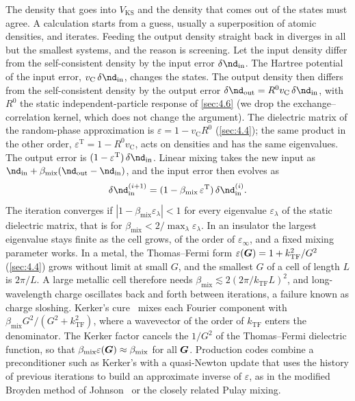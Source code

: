 The density that goes into $V_{\mathrm{KS}}$ and the density that comes out of the states must agree. A calculation starts from a guess, usually a superposition of atomic densities, and iterates. Feeding the output density straight back in diverges in all but the smallest systems, and the reason is screening. Let the input density differ from the self-consistent density by the input error $\delta\nd_{\mathrm{in}}$. The Hartree potential of the input error, $v_{\mathrm{C}}\,\delta\nd_{\mathrm{in}}$, changes the states. The output density then differs from the self-consistent density by the output error $\delta\nd_{\mathrm{out}} = R^0v_{\mathrm{C}}\,\delta\nd_{\mathrm{in}}$, with $R^0$ the static independent-particle response of \cref{sec:4.6} (we drop the exchange--correlation kernel, which does not change the argument). The dielectric matrix of the random-phase approximation is $\varepsilon = 1 - v_{\mathrm{C}}R^0$ (\cref{sec:4.4}); the same product in the other order, $\varepsilon^{\mathrm{T}} = 1 - R^0v_{\mathrm{C}}$, acts on densities and has the same eigenvalues. The output error is $(1 - \varepsilon^{\mathrm{T}})\,\delta\nd_{\mathrm{in}}$. Linear mixing takes the new input as $\nd_{\mathrm{in}} + \beta_{\mathrm{mix}}(\nd_{\mathrm{out}} - \nd_{\mathrm{in}})$, and the input error then evolves as
\begin{equation}
  \delta\nd_{\mathrm{in}}^{(i+1)} = (1 - \beta_{\mathrm{mix}}\,\varepsilon^{\mathrm{T}})\,\delta\nd_{\mathrm{in}}^{(i)} .
  \label{eq:E.1-mixing}
\end{equation}
The iteration converges if $|1 - \beta_{\mathrm{mix}}\varepsilon_\lambda| < 1$ for every eigenvalue $\varepsilon_\lambda$ of the static dielectric matrix, that is for $\beta_{\mathrm{mix}} < 2/\max_\lambda\varepsilon_\lambda$. In an insulator the largest eigenvalue stays finite as the cell grows, of the order of $\varepsilon_\infty$, and a fixed mixing parameter works. In a metal, the Thomas--Fermi form $\varepsilon(\bm{G}) = 1 + k_{\mathrm{TF}}^2/G^2$ (\cref{sec:4.4}) grows without limit at small $G$, and the smallest $G$ of a cell of length $L$ is $2\pi/L$. A large metallic cell therefore needs $\beta_{\mathrm{mix}} \lesssim 2(2\pi/k_{\mathrm{TF}}L)^2$, and long-wavelength charge oscillates back and forth between iterations, a failure known as charge sloshing. Kerker's cure~\cite{kerker1981efficient} mixes each Fourier component with $\beta_{\mathrm{mix}}G^2/(G^2 + k_{\mathrm{TF}}^2)$, where a wavevector of the order of $k_{\mathrm{TF}}$ enters the denominator. The Kerker factor cancels the $1/G^2$ of the Thomas--Fermi dielectric function, so that $\beta_{\mathrm{mix}}\varepsilon(\bm{G}) \approx \beta_{\mathrm{mix}}$ for all $\bm{G}$. Production codes combine a preconditioner such as Kerker's with a quasi-Newton update that uses the history of previous iterations to build an approximate inverse of $\varepsilon$, as in the modified Broyden method of Johnson~\cite{johnson1988modified} or the closely related Pulay mixing.

